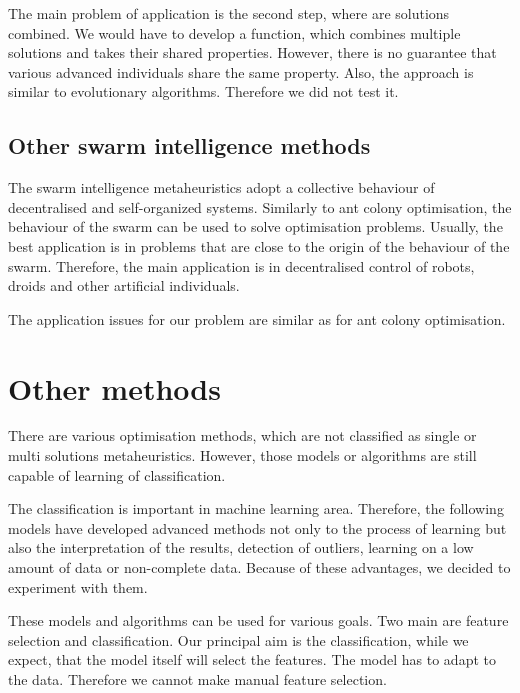\documentclass[
  print, %
  Table,   %
  nolof,     %
  nolot,     %
  11pt, %
  oneside  %
]{fithesis3}
\begin{document}
The main problem of application is the second step, where are solutions combined. We would have to develop a function, which combines multiple solutions and takes their shared properties. However, there is no guarantee that various advanced individuals share the same property. Also, the approach is similar to evolutionary algorithms. Therefore we did not test it.

\subsection{Other swarm intelligence methods}
\label{subsec:opt-multi-sol-si}

The swarm intelligence metaheuristics adopt a collective behaviour of decentralised and self-organized systems. Similarly to ant colony optimisation, the behaviour of the swarm can be used to solve optimisation problems. Usually, the best application is in problems that are close to the origin of the behaviour of the swarm. Therefore, the main application is in decentralised control of robots, droids and other artificial individuals.

The application issues for our problem are similar as for ant colony optimisation.

\section{Other methods}
\label{sec:opt-other}

There are various optimisation methods, which are not classified as single or multi solutions metaheuristics. However, those models or algorithms are still capable of learning of classification.

The classification is important in machine learning area. Therefore, the following models have developed advanced methods not only to the process of learning but also the interpretation of the results, detection of outliers, learning on a low amount of data or non-complete data. Because of these advantages, we decided to experiment with them.

These models and algorithms can be used for various goals. Two main are feature selection and classification. Our principal aim is the classification, while we expect, that the model itself will select the features. The model has to adapt to the data. Therefore we cannot make manual feature selection.

\end{document}
